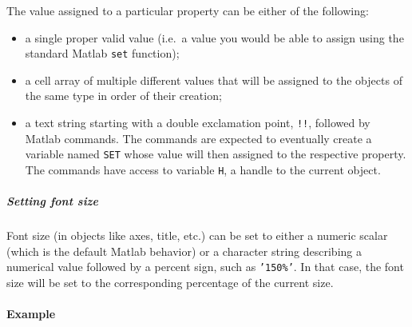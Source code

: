  The value assigned to a particular property can be either of the
 following:
 
 \begin{itemize}
 \item
   a single proper valid value (i.e.~a value you would be able to assign
   using the standard Matlab \texttt{set} function);
 \item
   a cell array of multiple different values that will be assigned to the
   objects of the same type in order of their creation;
 \item
   a text string starting with a double exclamation point, \texttt{!!},
   followed by Matlab commands. The commands are expected to eventually
   create a variable named \texttt{SET} whose value will then assigned to
   the respective property. The commands have access to variable
   \texttt{H}, a handle to the current object.
 \end{itemize}
 
 \subparagraph{Setting font size}
 
 Font size (in objects like axes, title, etc.) can be set to either a
 numeric scalar (which is the default Matlab behavior) or a character
 string describing a numerical value followed by a percent sign, such as
 \texttt{'150\%'}. In that case, the font size will be set to the
 corresponding percentage of the current size.
 
 \paragraph{Example}


